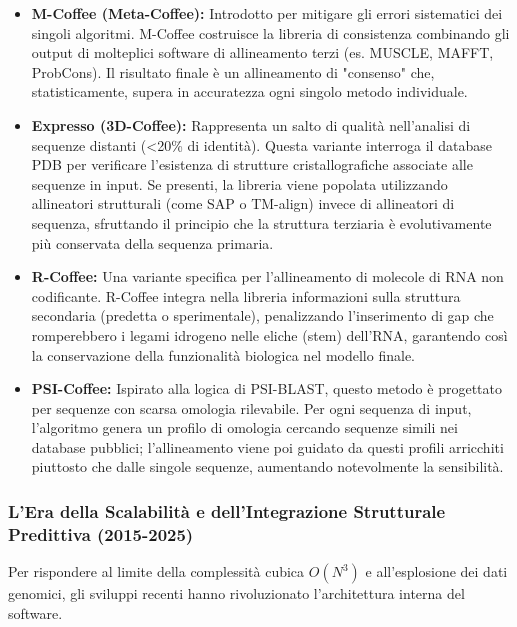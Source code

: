 \begin{itemize}
    \item \textbf{M-Coffee (Meta-Coffee):} Introdotto per mitigare gli errori sistematici dei singoli algoritmi. M-Coffee costruisce la libreria di consistenza combinando gli output di molteplici software di allineamento terzi (es. MUSCLE, MAFFT, ProbCons). Il risultato finale è un allineamento di "consenso" che, statisticamente, supera in accuratezza ogni singolo metodo individuale.
    
    \item \textbf{Expresso (3D-Coffee):} Rappresenta un salto di qualità nell'analisi di sequenze distanti (<20\% di identità). Questa variante interroga il database PDB per verificare l'esistenza di strutture cristallografiche associate alle sequenze in input. Se presenti, la libreria viene popolata utilizzando allineatori strutturali (come SAP o TM-align) invece di allineatori di sequenza, sfruttando il principio che la struttura terziaria è evolutivamente più conservata della sequenza primaria.
    
    \item \textbf{R-Coffee:} Una variante specifica per l'allineamento di molecole di RNA non codificante. R-Coffee integra nella libreria informazioni sulla struttura secondaria (predetta o sperimentale), penalizzando l'inserimento di gap che romperebbero i legami idrogeno nelle eliche (stem) dell'RNA, garantendo così la conservazione della funzionalità biologica nel modello finale.
    
    \item \textbf{PSI-Coffee:} Ispirato alla logica di PSI-BLAST, questo metodo è progettato per sequenze con scarsa omologia rilevabile. Per ogni sequenza di input, l'algoritmo genera un profilo di omologia cercando sequenze simili nei database pubblici; l'allineamento viene poi guidato da questi profili arricchiti piuttosto che dalle singole sequenze, aumentando notevolmente la sensibilità.
\end{itemize}

\subsubsection{L'Era della Scalabilità e dell'Integrazione Strutturale Predittiva (2015-2025)}
Per rispondere al limite della complessità cubica $O(N^3)$ e all'esplosione dei dati genomici, gli sviluppi recenti hanno rivoluzionato l'architettura interna del software.

